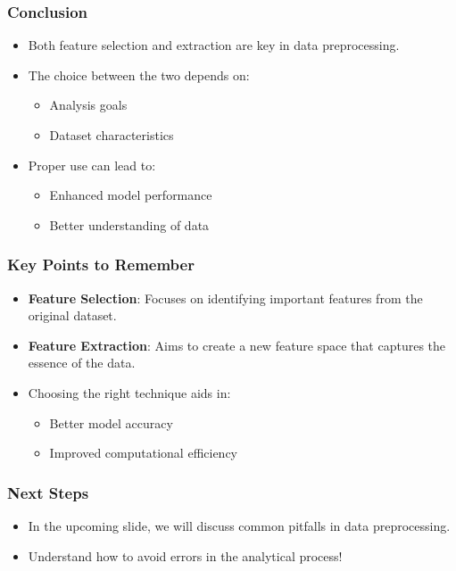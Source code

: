 \documentclass[aspectratio=169]{beamer}
\begin{document}
\begin{frame}[fragile]
    \frametitle{Conclusion}
    \begin{itemize}
        \item Both feature selection and extraction are key in data preprocessing.
        \item The choice between the two depends on:
        \begin{itemize}
            \item Analysis goals
            \item Dataset characteristics
        \end{itemize}
        \item Proper use can lead to:
        \begin{itemize}
            \item Enhanced model performance
            \item Better understanding of data
        \end{itemize}
    \end{itemize}
\end{frame}

\begin{frame}[fragile]
    \frametitle{Key Points to Remember}
    \begin{itemize}
        \item \textbf{Feature Selection}: Focuses on identifying important features from the original dataset.
        \item \textbf{Feature Extraction}: Aims to create a new feature space that captures the essence of the data.
        \item Choosing the right technique aids in:
        \begin{itemize}
            \item Better model accuracy
            \item Improved computational efficiency
        \end{itemize}
    \end{itemize}
\end{frame}

\begin{frame}[fragile]
    \frametitle{Next Steps}
    \begin{itemize}
        \item In the upcoming slide, we will discuss common pitfalls in data preprocessing.
        \item Understand how to avoid errors in the analytical process!
    \end{itemize}
\end{frame}
\end{document}
